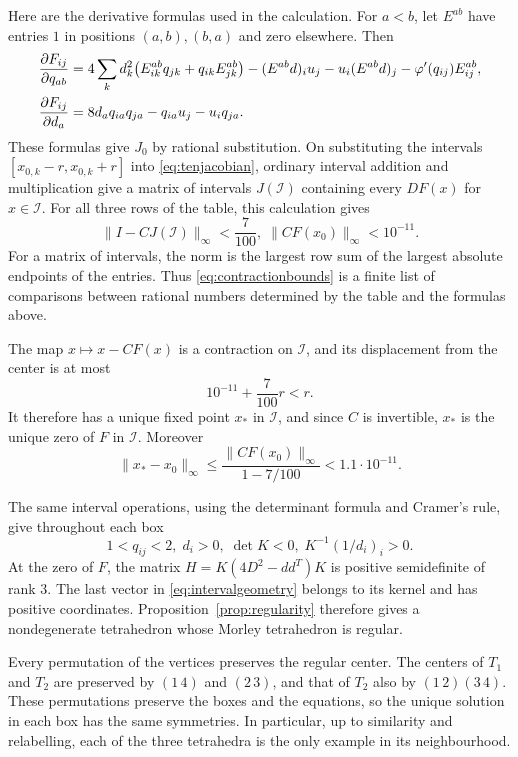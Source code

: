 \documentclass[11pt]{article}
\theoremstyle{definition}
\theoremstyle{remark}
\newcommand{\norm}[1]{\lVert #1 \rVert}
\newcommand{\ph}{\varphi}
\begin{document}
Here are the derivative formulas used in the calculation. For $a<b$, let $E^{ab}$ have entries $1$ in positions $(a,b),(b,a)$ and zero elsewhere. Then
\begin{align}
\frac{\partial F_{ij}}{\partial q_{ab}}
={}&4\sum_k d_k^2\bigl(E^{ab}_{ik}q_{jk}+q_{ik}E^{ab}_{jk}\bigr)
-(E^{ab}d)_i u_j-u_i(E^{ab}d)_j
-\ph'(q_{ij})E^{ab}_{ij},\notag\\
\frac{\partial F_{ij}}{\partial d_a}
={}&8d_aq_{ia}q_{ja}-q_{ia}u_j-u_iq_{ja}.
\label{eq:tenjacobian}
\end{align}
These formulas give $J_0$ by rational substitution. On substituting the intervals $[x_{0,k}-r,x_{0,k}+r]$ into \eqref{eq:tenjacobian}, ordinary interval addition and multiplication give a matrix of intervals $J(\mathcal I)$ containing every $DF(x)$ for $x\in\mathcal I$. For all three rows of the table, this calculation gives
\begin{equation}
\norm{I-CJ(\mathcal I)}_\infty<\frac7{100},
\; \norm{CF(x_0)}_\infty<10^{-11}.
\label{eq:contractionbounds}
\end{equation}
For a matrix of intervals, the norm is the largest row sum of the largest absolute endpoints of the entries. Thus \eqref{eq:contractionbounds} is a finite list of comparisons between rational numbers determined by the table and the formulas above.

The map $x\mapsto x-CF(x)$ is a contraction on $\mathcal I$, and its displacement from the center is at most
\[
10^{-11}+\frac7{100}r<r.
\]
It therefore has a unique fixed point $x_*$ in $\mathcal I$, and since $C$ is invertible, $x_*$ is the unique zero of $F$ in $\mathcal I$. Moreover
\begin{equation}
\norm{x_*-x_0}_\infty\le\frac{\norm{CF(x_0)}_\infty}{1-7/100}<1.1\cdot10^{-11}.
\label{eq:sharpbox}
\end{equation}

The same interval operations, using the determinant formula and Cramer's rule, give throughout each box
\begin{equation}
1<q_{ij}<2,\; d_i>0,\; \det K<0,
\; K^{-1}(1/d_i)_i>0.
\label{eq:intervalgeometry}
\end{equation}
At the zero of $F$, the matrix $H=K(4D^2-dd^T)K$ is positive semidefinite of rank $3$. The last vector in \eqref{eq:intervalgeometry} belongs to its kernel and has positive coordinates. Proposition~\ref{prop:regularity} therefore gives a nondegenerate tetrahedron whose Morley tetrahedron is regular.

Every permutation of the vertices preserves the regular center. The centers of $T_1$ and $T_2$ are preserved by $(1\,4)$ and $(2\,3)$, and that of $T_2$ also by $(1\,2)(3\,4)$. These permutations preserve the boxes and the equations, so the unique solution in each box has the same symmetries. In particular, up to similarity and relabelling, each of the three tetrahedra is the only example in its neighbourhood.
\end{document}
